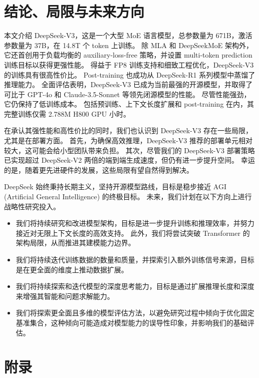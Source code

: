 \documentclass[11pt, a4paper, logo, copyright, nonumbering]{deepseek}
\newcommand{\dsvii}{DeepSeek-V2}
\newcommand{\dsattn}{MLA}
\newcommand{\dsmoe}{DeepSeekMoE}
\newcommand{\dsviii}{DeepSeek-V3}
\begin{document}
\section{结论、局限与未来方向}
\label{sec:conclusion}

本文介绍 \dsviii{}，这是一个大型 MoE 语言模型，总参数量为 671B，激活参数量为 37B，在 14.8T 个 token 上训练。
除 \dsattn{} 和 \dsmoe{} 架构外，它还首创用于负载均衡的 auxiliary-loss-free 策略，并设置 multi-token prediction 训练目标以获得更强性能。
得益于 FP8 训练支持和细致工程优化，\dsviii{} 的训练具有很高性价比。
Post-training 也成功从 DeepSeek-R1 系列模型中蒸馏了推理能力。
全面评估表明，DeepSeek-V3 已成为当前最强的开源模型，并取得了可比于 GPT-4o 和 Claude-3.5-Sonnet 等领先闭源模型的性能。
尽管性能强劲，它仍保持了低训练成本。
包括预训练、上下文长度扩展和 post-training 在内，其完整训练仅需 2.788M H800 GPU 小时。

在承认其强性能和高性价比的同时，我们也认识到 \dsviii{} 存在一些局限，尤其是在部署方面。
首先，为确保高效推理，\dsviii{} 推荐的部署单元相对较大，这可能会给小型团队带来负担。
其次，尽管我们的 \dsviii{} 部署策略已实现超过 \dsvii{} 两倍的端到端生成速度，但仍有进一步提升空间。
幸运的是，随着更先进硬件的发展，这些局限有望自然得到解决。

DeepSeek 始终秉持长期主义，坚持开源模型路线，目标是稳步接近 AGI (Artificial General Intelligence) 的终极目标。
未来，我们计划在以下方向上进行战略性研究投入。
\begin{itemize}
    \item 
    我们将持续研究和改进模型架构，目标是进一步提升训练和推理效率，并努力接近对无限上下文长度的高效支持。
    此外，我们将尝试突破 Transformer 的架构局限，从而推进其建模能力边界。
    \item 
    我们将持续迭代训练数据的数量和质量，并探索引入额外训练信号来源，目标是在更全面的维度上推动数据扩展。
    \item 
    我们将持续探索和迭代模型的深度思考能力，目标是通过扩展推理长度和深度来增强其智能和问题求解能力。
    \item 
    我们将探索更全面且多维的模型评估方法，以避免研究过程中倾向于优化固定基准集合，这种倾向可能造成对模型能力的误导性印象，并影响我们的基础评估。
\end{itemize}



\newpage
\appendix

\section*{附录}
\end{document}
